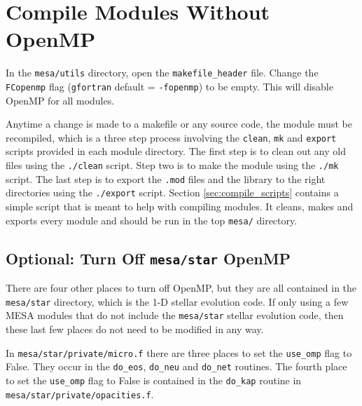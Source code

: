 \section{Compile Modules Without OpenMP}
\label{sec:compile_wo_omp}

In the {\tt mesa/utils} directory, open the {\tt makefile\_header} file. 
Change the {\tt FCopenmp} flag ({\tt gfortran} default = {\tt -fopenmp}) to 
be empty. This will disable OpenMP for all modules. 

Anytime a change is made to a makefile or any source code, the module must 
be recompiled, which is a three step process involving the {\tt clean}, 
{\tt mk} and {\tt export} scripts provided in each module directory. The 
first step is to clean out any old files using the {\tt ./clean} script. 
Step two is to make the module using the {\tt ./mk} script. The last step is 
to export the {\tt .mod} files and the library to the right directories using 
the {\tt ./export} script. Section \ref{sec:compile_scripts} contains a 
simple script that is meant to help with compiling modules. It cleans, makes 
and exports every module and should be run in the top {\tt mesa/} directory.

\subsection{Optional: Turn Off {\tt mesa/star} OpenMP}
There are four other places to turn off OpenMP, but they are all contained 
in the {\tt mesa/star} directory, which is the 1-D stellar evolution code. If 
only using a few {\sf MESA} modules that do not include the {\tt mesa/star} 
stellar evolution code, then these last few places do not need to be 
modified in any way. 

In {\tt mesa/star/private/micro.f} there are three places 
to set the {\tt use\_omp} flag to False. They occur in the {\tt do\_eos}, 
{\tt do\_neu} and {\tt do\_net} routines. The fourth place to set the 
{\tt use\_omp} flag to False is contained in the {\tt do\_kap} routine in 
{\tt mesa/star/private/opacities.f}.

